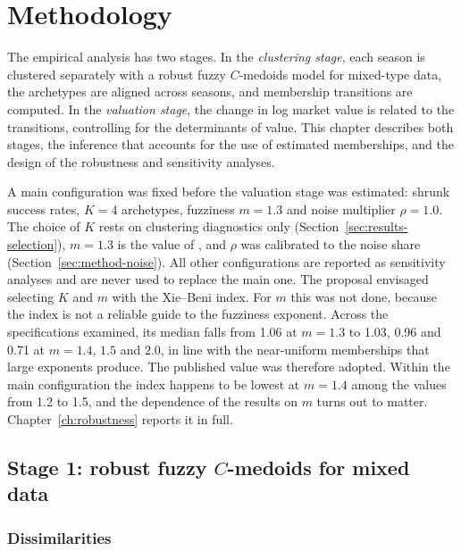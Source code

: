 \chapter{Methodology}
\label{ch:methodology}

The empirical analysis has two stages. In the \emph{clustering stage}, each season is clustered separately with a robust fuzzy $C$-medoids model for mixed-type data, the archetypes are aligned across seasons, and membership transitions are computed. In the \emph{valuation stage}, the change in log market value is related to the transitions, controlling for the determinants of value. This chapter describes both stages, the inference that accounts for the use of estimated memberships, and the design of the robustness and sensitivity analyses.

A main configuration was fixed before the valuation stage was estimated: shrunk success rates, $K=4$ archetypes, fuzziness $m=1.3$ and noise multiplier $\rho=1.0$. The choice of $K$ rests on clustering diagnostics only (Section~\ref{sec:results-selection}), $m=1.3$ is the value of , and $\rho$ was calibrated to the noise share (Section~\ref{sec:method-noise}). All other configurations are reported as sensitivity analyses and are never used to replace the main one. The proposal envisaged selecting $K$ and $m$ with the Xie--Beni index. For $m$ this was not done, because the index is not a reliable guide to the fuzziness exponent. Across the specifications examined, its median falls from 1.06 at $m=1.3$ to 1.03, 0.96 and 0.71 at $m=1.4$, $1.5$ and $2.0$, in line with the near-uniform memberships that large exponents produce. The published value was therefore adopted. Within the main configuration the index happens to be lowest at $m=1.4$ among the values from 1.2 to 1.5, and the dependence of the results on $m$ turns out to matter. Chapter~\ref{ch:robustness} reports it in full.

\section{Stage 1: robust fuzzy $C$-medoids for mixed data}
\label{sec:method-model}

\subsection{Dissimilarities}

